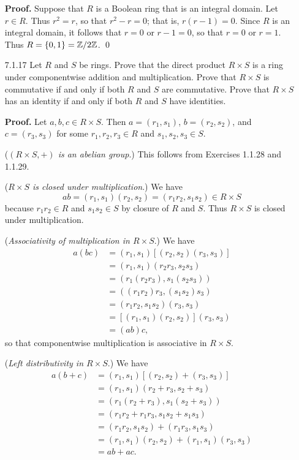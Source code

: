 \begin{enumerate}
      \textbf{Proof.} Suppose that $R$ is a Boolean ring that is an integral
      domain. Let $r \in R$. Thus $r^2 = r$, so that $r^2 - r = 0$; that is,
      $r(r - 1) = 0$. Since $R$ is an integral domain, it follows that $r = 0$
      or $r - 1 = 0$, so that $r = 0$ or $r = 1$. Thus $R = \{0, 1\} = \mathbb{Z}/2\mathbb{Z}$.
      \qed
   \item[7.1.17]  Let $R$ and $S$ be rings. Prove that the direct product
                  $R \times S$ is a ring under componentwise addition and
                  multiplication. Prove that $R \times S$ is commutative if and
                  only if both $R$ and $S$ are commutative. Prove that
                  $R \times S$ has an identity if and only if both $R$ and $S$
                  have identities.

      \textbf{Proof.} Let $a, b, c \in R \times S$. Then $a = (r_1, s_1)$,
      $b = (r_2, s_2)$, and $c = (r_3, s_3)$ for some $r_1, r_2, r_3 \in R$ and 
      $s_1, s_2, s_3 \in S$.

      (\textit{$(R \times S, +)$ is an abelian group}.) This follows from
      Exercises 1.1.28 and 1.1.29.

      (\textit{$R \times S$ is closed under multiplication}.) We have
      $$ab = (r_1, s_1)(r_2, s_2) = (r_1r_2, s_1s_2) \in R \times S$$
      because $r_1r_2 \in R$ and $s_1s_2 \in S$ by closure of $R$ and $S$. Thus
      $R \times S$ is closed under multiplication.

      (\textit{Associativity of multiplication in $R \times S$}.) We have
      \begin{align*}
         a(bc) &= (r_1, s_1)[(r_2, s_2)(r_3, s_3)] \\
            &= (r_1, s_1)(r_2r_3, s_2s_3) \\
            &= (r_1(r_2r_3), s_1(s_2s_3)) \\
            &= ((r_1r_2)r_3, (s_1s_2)s_3) \\
            &= (r_1r_2, s_1s_2)(r_3, s_3) \\
            &= [(r_1, s_1)(r_2, s_2)](r_3, s_3) \\
            &= (ab)c,
      \end{align*}
      so that componentwise multiplication is associative in $R \times S$.

      (\textit{Left distributivity in $R \times S$}.) We have
      \begin{align*}
         a(b + c) &= (r_1, s_1)[(r_2, s_2) + (r_3, s_3)] \\
            &= (r_1, s_1)(r_2 + r_3, s_2 + s_3) \\
            &= (r_1(r_2 + r_3), s_1(s_2 + s_3)) \\
            &= (r_1r_2 + r_1r_3, s_1s_2 + s_1s_3) \\
            &= (r_1r_2, s_1s_2) + (r_1r_3, s_1s_3) \\
            &= (r_1, s_1)(r_2, s_2) + (r_1, s_1)(r_3, s_3) \\
            &= ab + ac.
      \end{align*}



\end{enumerate}
